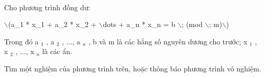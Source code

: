  

Cho phương trình đồng dư:

$\backslash$(a\_1 * x\_1 + a\_2 * x\_2 + $\backslash$dots + a\_n * x\_n = b $\backslash$; (mod $\backslash$; m)$\backslash$)

Trong đó a $_ 1 $ , a $_ 2 $ , ..., a $_ n $ , b và m là các hằng số nguyên dương cho trước; x $_ 1 $ , x $_ 2 $ , ..., x $_ n $ là các ẩn.

Tìm một nghiệm của phương trình trên, hoặc thông báo phương trình vô nghiệm.